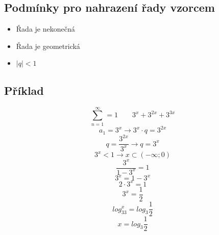     \subsection{Podmínky pro nahrazení řady vzorcem}
        \begin{itemize}
            \item Řada je nekonečná
            \item Řada je geometrická
            \item $|q|<1$
        \end{itemize}
    \subsection{Příklad}
    $$
    \sum^\infty_{n=1}=1 \quad\quad 3^x+3^{2x}+3^{3x}
    $$
    $$
    a_1=3^x \rightarrow 3^x\cdot q=3^{2x}
    $$
    $$
    q=\frac{3^{2x}}{3^x}\rightarrow q=3^x
    $$
    $$
    3^x<1 \rightarrow x\subset (-\infty;0)
    $$
    $$
    \frac{3^x}{1-3^x}=1
    $$
    $$
    3^x=1-3^x
    $$
    $$
    2\cdot 3^x=1
    $$
    $$
    3^x=\frac{1}{2}
    $$
    $$
    log_33^x=log_3\frac{1}{2}
    $$
    $$
    x=log_3\frac{1}{2}
    $$